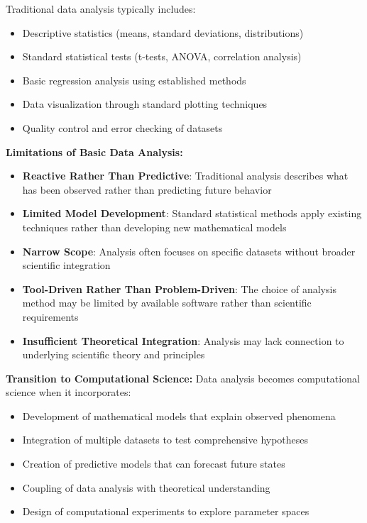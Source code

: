 Traditional data analysis typically includes:
\begin{itemize}
    \item Descriptive statistics (means, standard deviations, distributions)
    \item Standard statistical tests (t-tests, ANOVA, correlation analysis)
    \item Basic regression analysis using established methods
    \item Data visualization through standard plotting techniques
    \item Quality control and error checking of datasets
\end{itemize}

\textbf{Limitations of Basic Data Analysis:}
\begin{itemize}
    \item \textbf{Reactive Rather Than Predictive}: Traditional analysis describes what has been observed rather than predicting future behavior
    \item \textbf{Limited Model Development}: Standard statistical methods apply existing techniques rather than developing new mathematical models
    \item \textbf{Narrow Scope}: Analysis often focuses on specific datasets without broader scientific integration
    \item \textbf{Tool-Driven Rather Than Problem-Driven}: The choice of analysis method may be limited by available software rather than scientific requirements
    \item \textbf{Insufficient Theoretical Integration}: Analysis may lack connection to underlying scientific theory and principles
\end{itemize}

\textbf{Transition to Computational Science:}
Data analysis becomes computational science when it incorporates:
\begin{itemize}
    \item Development of mathematical models that explain observed phenomena
    \item Integration of multiple datasets to test comprehensive hypotheses
    \item Creation of predictive models that can forecast future states
    \item Coupling of data analysis with theoretical understanding
    \item Design of computational experiments to explore parameter spaces
\end{itemize}


